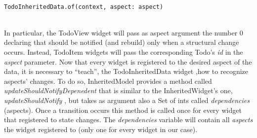 \begin{code}
\label{code:2.47}
\begin{verbatim}

TodoInheritedData.of(context, aspect: aspect)
\end{verbatim}
\end{code}
\mbox{}\\
In particular, the TodoView widget will pass as aspect argument the number 0 declaring that should be notified (and rebuild) only when a structural change occurs.
Instead, TodoItem widgets will pass the corresponding Todo’s \textit{id} in the \textit{aspect} parameter.
Now that every widget is registered to the desired aspect of the data, it is necessary to “teach”, the TodoInheritedData widget ,how to recognize aspects' changes. To do so, InheritedModel provides a method called \textit{updateShouldNotifyDepenedent} that is similar to the InheritedWidget’s one, \textit{updateShouldNotify }, but takes as argument also a Set of ints called \textit{dependencies }  (aspects). Once a transition occurs this method is called once for every widget that registered to state changes. The \textit{dependencies }  variable will contain all \textit{aspects} the widget registered to (only one for every widget in our case). 
\mbox{}\\
